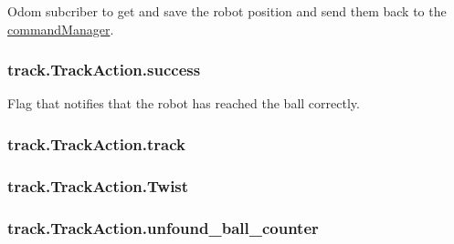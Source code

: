 Odom subcriber to get and save the robot position and send them back to the \hyperlink{namespacecommandManager}{command\+Manager}. 

\subsubsection[{\texorpdfstring{success}{success}}]{\setlength{\rightskip}{0pt plus 5cm}track.\+Track\+Action.\+success\hspace{0.3cm}{\ttfamily [static]}}\hypertarget{classtrack_1_1TrackAction_a8c79189ba62cf316bffaa4c00b0320fe}{}\label{classtrack_1_1TrackAction_a8c79189ba62cf316bffaa4c00b0320fe}


Flag that notifies that the robot has reached the ball correctly. 

\subsubsection[{\texorpdfstring{track}{track}}]{\setlength{\rightskip}{0pt plus 5cm}track.\+Track\+Action.\+track\hspace{0.3cm}{\ttfamily [static]}}\hypertarget{classtrack_1_1TrackAction_a3d89a5a6bf3daf63df4b690e4c9a84a8}{}\label{classtrack_1_1TrackAction_a3d89a5a6bf3daf63df4b690e4c9a84a8}
\subsubsection[{\texorpdfstring{Twist}{Twist}}]{\setlength{\rightskip}{0pt plus 5cm}track.\+Track\+Action.\+Twist\hspace{0.3cm}{\ttfamily [static]}}\hypertarget{classtrack_1_1TrackAction_aabd955eb5b74ee508ba27bf6db4129e2}{}\label{classtrack_1_1TrackAction_aabd955eb5b74ee508ba27bf6db4129e2}
\subsubsection[{\texorpdfstring{unfound\+\_\+ball\+\_\+counter}{unfound_ball_counter}}]{\setlength{\rightskip}{0pt plus 5cm}track.\+Track\+Action.\+unfound\+\_\+ball\+\_\+counter\hspace{0.3cm}{\ttfamily [static]}}\hypertarget{classtrack_1_1TrackAction_aabc16f100d1f260d6712d8d74e055fda}{}\label{classtrack_1_1TrackAction_aabc16f100d1f260d6712d8d74e055fda}


